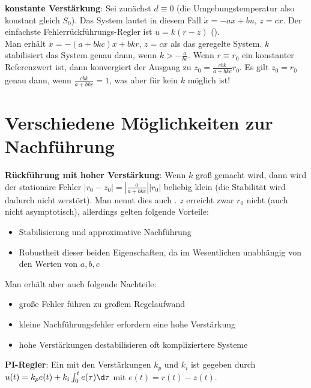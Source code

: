 \textbf{konstante Verstärkung}:
Sei zunächst $d \equiv 0$ (die Umgebungstemperatur also konstant gleich $S_0$).
Das System lautet in diesem Fall $\dot{x} = -ax + bu$, $z = cx$.
Der einfachste Fehlerrückführungs-Regler ist $u = k(r - z)$
().\\
Man erhält $\dot{x} = -(a + bkc)x + bkr$, $z = cx$ als das geregelte System.
$k$ stabilisiert das System genau dann, wenn $k > -\frac{a}{bc}$.
Wenn $r \equiv r_0$ ein konstanter Referenzwert ist, dann konvergiert der Ausgang zu
$z_0 = \frac{cbk}{a + bkc} r_0$.
Es gilt $z_0 = r_0$ genau dann, wenn $\frac{cbk}{a + bkc} = 1$, was aber für kein $k$ möglich ist!

\pagebreak

\section{%
    Verschiedene Möglichkeiten zur Nachführung%
}

\textbf{Rückführung mit hoher Verstärkung}:
Wenn $k$ groß gemacht wird, dann wird der stationäre Fehler
$|r_0 - z_0| = \left|\frac{a}{a + bkc}\right| |r_0|$ beliebig klein
(die Stabilität wird dadurch nicht zerstört).
Man nennt dies auch .
$z$ erreicht zwar $r_0$ nicht (auch nicht asymptotisch), allerdings gelten folgende Vorteile:
\begin{itemize}
    \item
    Stabilisierung und approximative Nachführung

    \item
    Robustheit dieser beiden Eigenschaften, da im Wesentlichen unabhängig von den Werten von
    $a, b, c$
\end{itemize}
Man erhält aber auch folgende Nachteile:
\begin{itemize}
    \item
    große Fehler führen zu großem Regelaufwand

    \item
    kleine Nachführungsfehler erfordern eine hohe Verstärkung

    \item
    hohe Verstärkungen destabilisieren oft kompliziertere Systeme
\end{itemize}

\linie

\textbf{PI-Regler}:
Ein 
mit den Verstärkungen $k_p$ und $k_i$ ist gegeben durch
$u(t) = k_p e(t) + k_i \int_0^t e(\tau)\d\tau$ mit $e(t) = r(t) - z(t)$.

